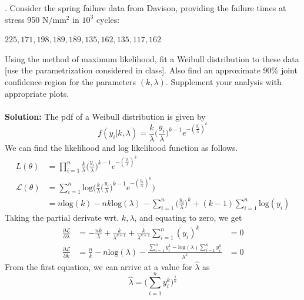 \documentclass[11pt]{article}
\begin{document}
. Consider the spring failure data from Davison, providing the failure
times at stress 950 $\text{N}/\text{mm}^{2}$ in $10^{3}$ cycles:
\begin{center}
  $225, 171, 198, 189, 189, 135, 162, 135, 117, 162$
\end{center}
Using the method of maximum likelihood, fit a Weibull distribution to these data
[use the parametrization considered in class]. Also find an approximate 90\% joint
confidence region for the parameters $(k, \lambda)$. Supplement your analysis with appropriate plots.\\ \\
\textbf{Solution:}
The pdf of a Weibull distribution is given by
\begin{equation}
  \nonumber
  f(y_{i} | k, \lambda) = \frac{k}{\lambda}\bigg(\frac{y_{i}}{\lambda}\bigg)^{k - 1}e^{-(\frac{y_{i}}{\lambda})^{k}}
\end{equation}
We can find the likelihood and log likelihood function as follows.
\begin{equation}
  \nonumber
  \begin{aligned}
    L(\theta) & = \prod_{i = 1}^{n} \frac{k}{\lambda}\bigg(\frac{y_{i}}{\lambda}\bigg)^{k - 1}e^{-(\frac{y_{i}}{\lambda})^{k}}\\
    \mathcal{L}(\theta) & = \sum_{i = 1}^{n} \text{log}\bigg(\frac{k}{\lambda}\bigg(\frac{y_{i}}{\lambda}\bigg)^{k - 1}e^{-(\frac{y_{i}}{\lambda})^{k}}\bigg)\\
    & = n \text{log}(k) - nk \text{log}(\lambda) - \sum_{i = 1}^{n} \bigg(\frac{y_{i}}{\lambda}\bigg)^{k} + (k - 1)\sum_{i = 1}^{n} \text{log}(y_{i})
  \end{aligned}
\end{equation}
Taking the partial derivate wrt. $k, \lambda$, and equating to zero, we get
\begin{equation}
  \nonumber
  \begin{aligned}
      \frac{\partial \mathcal{L}}{\partial \lambda} & = -\frac{nk}{\lambda} + \frac{k}{\lambda^{k + 1}} + \frac{k}{\lambda^{k + 1}} \sum_{i = 1}^{n} (y_{i})^{k} & = 0\\
      \frac{\partial \mathcal{L}}{\partial k} & = \frac{n}{k} - n \text{log}(\lambda) - \frac{\sum_{i = 1}^{n}y_{i}^{k} - \text{log}(\lambda) \sum_{i = 1}^{n} y_{i}^{k}}{\lambda^{k}} & = 0
  \end{aligned}
\end{equation}
From the first equation, we can arrive at a value for $\hat{\lambda}$ as
\begin{equation}
  \nonumber
  \hat{\lambda} = \bigg(\sum_{i = 1}^{n} y_{i}^{k} \bigg)^{\frac{1}{k}}
\end{equation}
\end{document}
